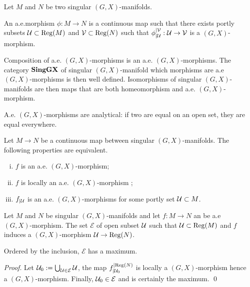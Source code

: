                     
					\begin{defi}[a.e.$(G,X)$-morphism]\label{def:morphism} Let
					$M$ and $N$ be two singular $(G,X)$-manifolds.

					An a.e.morphism $\phi:M\rightarrow N$ is a continuous map such that there exists portly subsets $\mathcal{U}\subset \mathrm{Reg}(M)$ and $\mathcal V\subset \mathrm{Reg}(N)$ such that
					$\phi_{|\mathcal{U}}^{|\mathcal V}:\mathcal{U}\rightarrow \mathcal V$ is a $(G,X)$-morphism.
					\end{defi}

					\begin{rem}\label{rem:composition_morphisms_morphisms_category} Composition of a.e. $(G,X)$-morphisms is an a.e. $(G,X)$-morphisms. The category $\mathbf{SingGX}$ of singular $(G,X)$-manifold which morphisms are a.e $(G,X)$-morphisms is then well defined. 
					Isomorphisms of singular $(G,X)$-manifolds are then maps that are both  homeomorphism and a.e. $(G,X)$-morphism.
					\end{rem}

                    \begin{rem}\label{rem:morphisms_analytical_two_equal} A.e. $(G,X)$-morphisms are analytical: if two are equal on an open set, they are equal everywhere.
                     
                    \end{rem}

					
					
					\begin{rem}\label{prop:GX_sing_morph_local}
					Let $M\rightarrow N$ be a continuous map between singular $(G,X)$-manifolds.
					The following properties are equivalent.
					\begin{enumerate}[(i)]
					 \item $f$ is an a.e. $(G,X)$-morphism;
					 \item $f$ is locally an a.e. $(G,X)$-morphism ;
					 \item $f_{|\mathcal{U}}$ is an a.e. $(G,X)$-morphisms for some portly set $\mathcal{U}\subset M$.
					\end{enumerate}
					\end{rem}

                \begin{lem}\label{lem:singular_manifolds_morphism_set} 
                   Let $M$ and $N$ be singular $(G,X)$-manifolds and let $f:M\rightarrow N$ an be a.e $(G,X)$-morphism. 
                   The set $\mathcal E$ of open subset $\mathcal{U}$ such that $\mathcal{U}\subset \mathrm{Reg}(M)$ and $f$ induces a $(G,X)$-morphism $\mathcal{U}\rightarrow \mathrm{Reg}(N)$.   
                   
                   Ordered by the inclusion, $\mathcal E$ has a maximum.
                    
                \end{lem}
                \begin{proof}
                  Let $\mathcal{U}_0:=\bigcup_{\mathcal{U}\in \mathcal E}\mathcal{U}$, the map $f_{|\mathcal{U}_0}^{|\mathrm{Reg}(N)}$ is locally a $(G,X)$-morphism hence a $(G,X)$-morphism. Finally, $\mathcal{U}_0\in \mathcal E$ and is certainly the maximum.
                \qed\end{proof}

